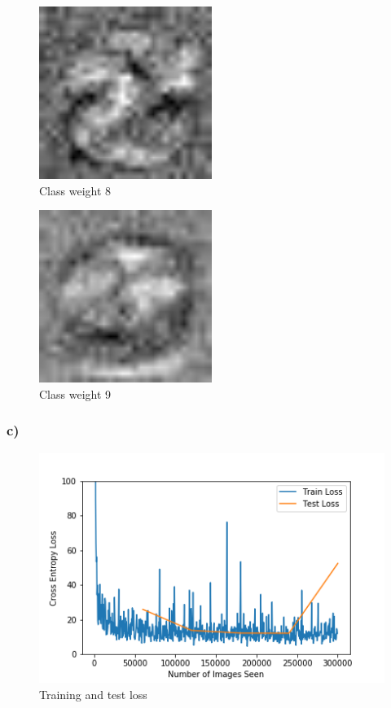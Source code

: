 \begin{figure}[]
    \centering
    \includegraphics[width=0.50\textwidth]{figures/weights/class_8_weight_image.jpg}
    \caption{Class weight 8}
    \label{fig:class_weight_8}
\end{figure}

\begin{figure}[]
    \centering
    \includegraphics[width=0.50\textwidth]{figures/weights/class_9_weight_image.jpg}
    \caption{Class weight 9}
    \label{fig:class_weight_9}
\end{figure}

\subsubsection*{c)}

\begin{figure}[]
    \centering
    \includegraphics[width=1.00\textwidth]{figures/new_learning_training_loss.png}
    \caption{Training and test loss}
    \label{fig:training_loss}
\end{figure}

